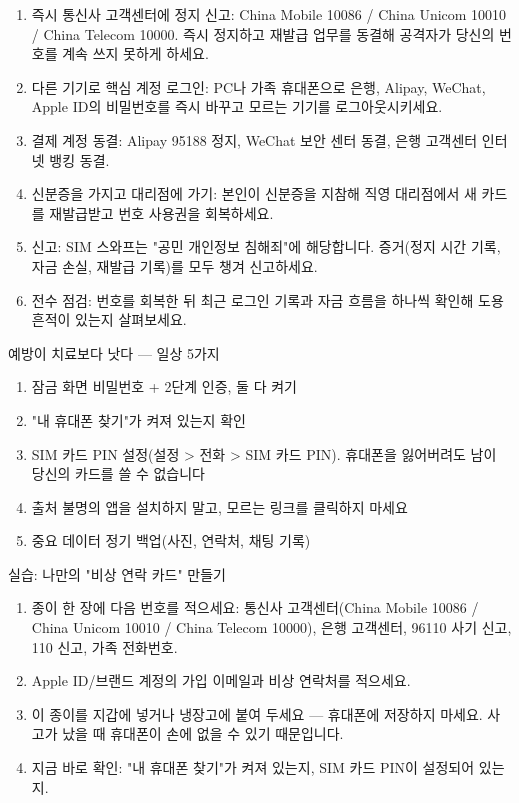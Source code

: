 \begin{enumerate}
  \item 즉시 통신사 고객센터에 정지 신고: China Mobile 10086 / China Unicom 10010 / China Telecom 10000. 즉시 정지하고 재발급 업무를 동결해 공격자가 당신의 번호를 계속 쓰지 못하게 하세요.
  \item 다른 기기로 핵심 계정 로그인: PC나 가족 휴대폰으로 은행, Alipay, WeChat, Apple ID의 비밀번호를 즉시 바꾸고 모르는 기기를 로그아웃시키세요.
  \item 결제 계정 동결: Alipay 95188 정지, WeChat 보안 센터 동결, 은행 고객센터 인터넷 뱅킹 동결.
  \item 신분증을 가지고 대리점에 가기: 본인이 신분증을 지참해 직영 대리점에서 새 카드를 재발급받고 번호 사용권을 회복하세요.
  \item 신고: SIM 스와프는 "공민 개인정보 침해죄"에 해당합니다. 증거(정지 시간 기록, 자금 손실, 재발급 기록)를 모두 챙겨 신고하세요.
  \item 전수 점검: 번호를 회복한 뒤 최근 로그인 기록과 자금 흐름을 하나씩 확인해 도용 흔적이 있는지 살펴보세요.
\end{enumerate}

\begin{tcbwarn}{예방이 치료보다 낫다 — 일상 5가지}
\begin{enumerate}
  \item 잠금 화면 비밀번호 + 2단계 인증, 둘 다 켜기
  \item "내 휴대폰 찾기"가 켜져 있는지 확인
  \item SIM 카드 PIN 설정(설정 > 전화 > SIM 카드 PIN). 휴대폰을 잃어버려도 남이 당신의 카드를 쓸 수 없습니다
  \item 출처 불명의 앱을 설치하지 말고, 모르는 링크를 클릭하지 마세요
  \item 중요 데이터 정기 백업(사진, 연락처, 채팅 기록)
\end{enumerate}

\end{tcbwarn}

\begin{tcbpractice}{실습: 나만의 "비상 연락 카드" 만들기}
\begin{enumerate}
  \item 종이 한 장에 다음 번호를 적으세요: 통신사 고객센터(China Mobile 10086 / China Unicom 10010 / China Telecom 10000), 은행 고객센터, 96110 사기 신고, 110 신고, 가족 전화번호.
  \item Apple ID/브랜드 계정의 가입 이메일과 비상 연락처를 적으세요.
  \item 이 종이를 지갑에 넣거나 냉장고에 붙여 두세요 — 휴대폰에 저장하지 마세요. 사고가 났을 때 휴대폰이 손에 없을 수 있기 때문입니다.
  \item 지금 바로 확인: "내 휴대폰 찾기"가 켜져 있는지, SIM 카드 PIN이 설정되어 있는지.
\end{enumerate}

\end{tcbpractice}

